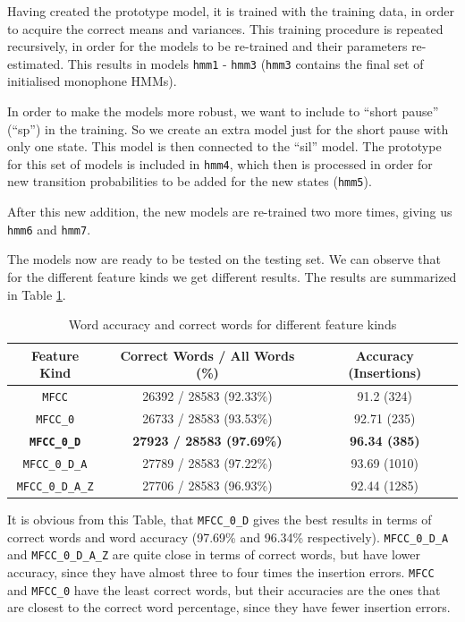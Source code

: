 \documentclass[12pt,a4paper,oneside]{article}
\begin{document}
Having created the prototype model, it is trained with the training data, in order to acquire the correct means and variances. This training procedure is repeated recursively, in order for the models to be re-trained and their parameters re-estimated. This results in models \texttt{hmm1} - \texttt{hmm3} (\texttt{hmm3} contains the final set of initialised monophone HMMs).

In order to make the models more robust, we want to include to ``short pause'' (``sp'') in the training. So we create an extra model just for the short pause with only one state. This model is then connected to the ``sil'' model. The prototype for this set of models is included in \texttt{hmm4}, which then is processed in order for new transition probabilities to be added for the new states (\texttt{hmm5}). 

After this new addition, the new models are re-trained two more times, giving us \texttt{hmm6} and \texttt{hmm7}.

The models now are ready to be tested on the testing set. We can observe that for the different feature kinds we get different results. The results are summarized in Table \ref{tab:results1}.

\begin{table}
\caption{Word accuracy and correct words for different feature kinds} \label{tab:results1}
    \begin{tabular}{|c||c||c|}
    \hline
    Feature Kind                 & Correct Words / All Words (\%)   & Accuracy (Insertions) 			\\ \hline \hline
    \texttt{MFCC}                & 26392 / 28583 (92.33\%)          & 91.2 (324)           			\\ \hline
    \texttt{MFCC\_0}             & 26733 / 28583 (93.53\%)          & 92.71 (235)           			\\ \hline
    \textbf{\texttt{MFCC\_0\_D}} & \textbf{27923 / 28583 (97.69\%)} & \textbf{96.34 (385)}           \\ \hline
    \texttt{MFCC\_0\_D\_A}       & 27789 / 28583 (97.22\%)          & 93.69 (1010)                   \\ \hline
    \texttt{MFCC\_0\_D\_A\_Z}    & 27706 / 28583 (96.93\%)          & 92.44 (1285)          			\\ \hline
    \end{tabular}
\end{table}

It is obvious from this Table, that \texttt{MFCC\_0\_D} gives the best results in terms of correct words and word accuracy (97.69\% and 96.34\% respectively). \texttt{MFCC\_0\_D\_A} and \texttt{MFCC\_0\_D\_A\_Z} are quite close in terms of correct words, but have lower accuracy, since they have almost three to four times the insertion errors. \texttt{MFCC} and \texttt{MFCC\_0} have the least correct words, but their accuracies are the ones that are closest to the correct word percentage, since they have fewer insertion errors.
\end{document}
